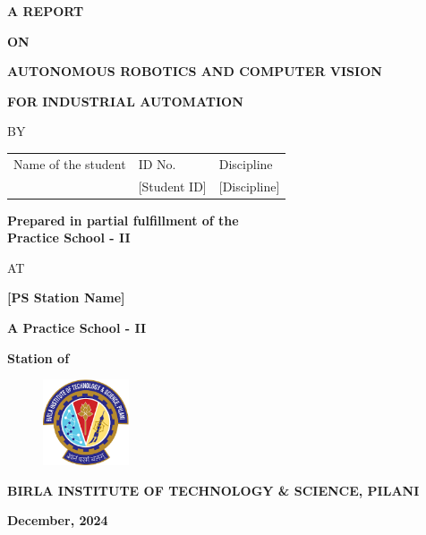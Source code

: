 \documentclass{book}
\begin{document}


\large

\thispagestyle{empty}
\centerline{\bf A REPORT}
\vspace*{0.3cm}
\centerline{\bf ON}
\vspace*{0.3cm}
\centerline{\bf AUTONOMOUS ROBOTICS AND COMPUTER VISION}
\centerline{\bf FOR INDUSTRIAL AUTOMATION}
\vspace*{2cm}

\centerline{BY}
\vspace*{1cm}

\begin{center}
	\begin{tabular}{lll}
		Name of the student & \hspace*{2cm} ID No. & \hspace*{2cm} Discipline \\ 
		[Student Name] &\hspace*{2cm} [Student ID] &\hspace*{2cm} [Discipline] \\
	\end{tabular}
\end{center}

\vspace*{2cm}
\begin{center}
	{\bf Prepared in partial fulfillment of the \\
	Practice School - II}
\end{center}

\vspace*{0.5cm}

\centerline{AT}

\vspace*{1cm}
        \centerline{\bf [PS Station Name]}
	\vspace{0.2cm}
	\centerline{\bf A Practice School - II}
	\vspace{0.2cm}
	\centerline{\bf Station of}
	\vspace{0.5cm}
\begin{figure}[ht]
\centerline{\includegraphics[width=1.0in]{logo.eps}}
\end{figure}

	\centerline{\bf BIRLA INSTITUTE OF TECHNOLOGY \& SCIENCE, PILANI}
	\vspace*{0.5cm}
	\centerline{\bf December, 2024}
	\newpage
\end{document}
